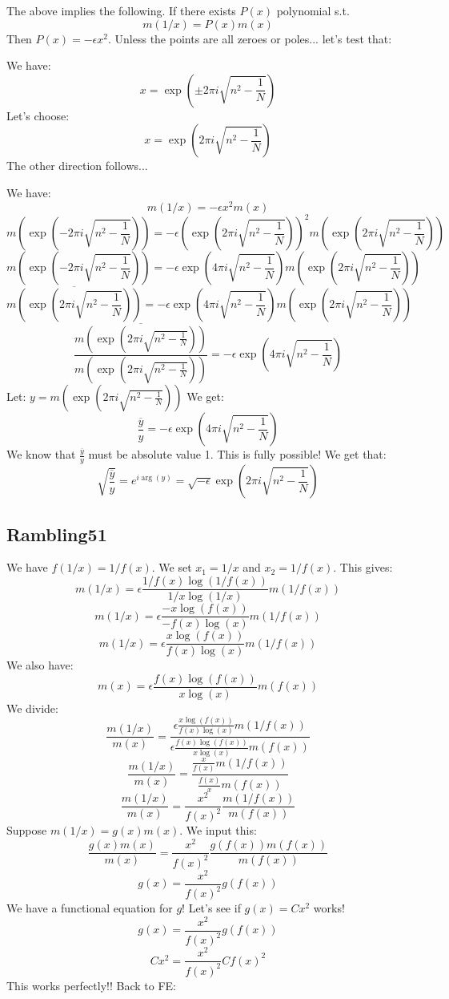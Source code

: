 \documentclass[a4paper]{amsart}
\begin{document}
The above implies the following. If there exists $P(x)$ polynomial s.t.
$$m(1/x) = P(x)m(x)$$
Then $P(x) = -\epsilon x^2$. Unless the points are all zeroes or poles... let's test that: 

We have:
$$x = \exp(\pm 2\pi i\sqrt{n^2 - \frac{1}{N}})$$
Let's choose:
$$x = \exp(2\pi i\sqrt{n^2 - \frac{1}{N}})$$
The other direction follows...

We have:
$$m(1/x) = -\epsilon x^2m(x)$$
$$m(\exp(-2\pi i\sqrt{n^2 - \frac{1}{N}})) = -\epsilon (\exp(2\pi i\sqrt{n^2 - \frac{1}{N}}))^2m(\exp(2\pi i\sqrt{n^2 - \frac{1}{N}}))$$
$$m(\exp(-2\pi i\sqrt{n^2 - \frac{1}{N}})) = -\epsilon \exp(4\pi i\sqrt{n^2 - \frac{1}{N}})m(\exp(2\pi i\sqrt{n^2 - \frac{1}{N}}))$$
$$\overline{m(\exp(2\pi i\sqrt{n^2 - \frac{1}{N}}))} = -\epsilon \exp(4\pi i\sqrt{n^2 - \frac{1}{N}})m(\exp(2\pi i\sqrt{n^2 - \frac{1}{N}}))$$
$$\frac{\overline{m(\exp(2\pi i\sqrt{n^2 - \frac{1}{N}}))}}{m(\exp(2\pi i\sqrt{n^2 - \frac{1}{N}}))} = -\epsilon \exp(4\pi i\sqrt{n^2 - \frac{1}{N}})$$
Let: 
$y = m(\exp(2\pi i\sqrt{n^2 - \frac{1}{N}}))$
We get:
$$\frac{\overline{y}}{y} = -\epsilon \exp(4\pi i\sqrt{n^2 - \frac{1}{N}})$$
We know that $\frac{\overline{y}}{y}$ must be absolute value 1.
This is fully possible! We get that:
$$\sqrt{\frac{\overline{y}}{y}} = e^{i \arg(y)} = \sqrt{-\epsilon} \exp(2\pi i\sqrt{n^2 - \frac{1}{N}})$$


\subsection{Rambling51}

We have $f(1/x) = 1/f(x)$. We set $x_1 = 1/x$ and $x_2 = 1/f(x)$. This gives:
$$m(1/x) = \epsilon\frac{1/f(x)\log(1/f(x))}{1/x\log(1/x)}m(1/f(x))$$
$$m(1/x) = \epsilon\frac{-x\log(f(x))}{-f(x)\log(x)}m(1/f(x))$$
$$m(1/x) = \epsilon\frac{x\log(f(x))}{f(x)\log(x)}m(1/f(x))$$
We also have:
$$m(x) = \epsilon\frac{f(x)\log(f(x))}{x\log(x)} m(f(x))$$
We divide:
$$\frac{m(1/x)}{m(x)} = \frac{\epsilon\frac{x\log(f(x))}{f(x)\log(x)}m(1/f(x))}{\epsilon\frac{f(x)\log(f(x))}{x\log(x)} m(f(x))}$$
$$\frac{m(1/x)}{m(x)} = \frac{\frac{x}{f(x)}m(1/f(x))}{\frac{f(x)}{x} m(f(x))}$$
$$\frac{m(1/x)}{m(x)} = \frac{x^2}{f(x)^2} \frac{m(1/f(x))}{m(f(x))}$$
Suppose $m(1/x) = g(x)m(x)$. We input this:
$$\frac{g(x)m(x)}{m(x)} = \frac{x^2}{f(x)^2} \frac{g(f(x))m(f(x))}{m(f(x))}$$
$$g(x) = \frac{x^2}{f(x)^2} g(f(x))$$
We have a functional equation for $g$! Let's see if $g(x) = Cx^2$ works!
$$g(x) = \frac{x^2}{f(x)^2} g(f(x))$$
$$Cx^2 = \frac{x^2}{f(x)^2} Cf(x)^2$$
This works perfectly!! Back to FE:
\end{document}
